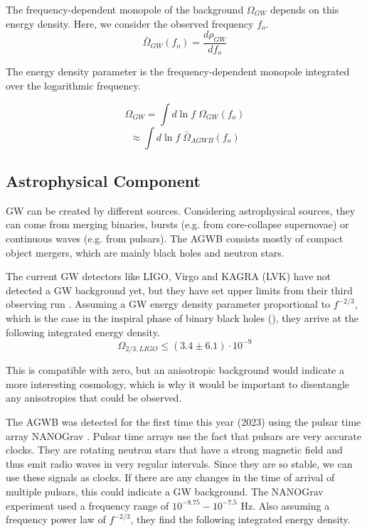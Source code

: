 The frequency-dependent monopole of the background $\Omega_{GW}$ depends on this energy density. Here, we consider the observed frequency $f_o$.
\begin{equation}
    \bar{\Omega}_{GW}(f_o)=\frac{d\rho_{GW}}{df_o}
\end{equation}

The energy density parameter is the frequency-dependent monopole integrated over the logarithmic frequency.

\begin{equation}
    \Omega_{GW} = \int d\ln f \; \Omega_{GW}(f_o) 
\end{equation}
\begin{equation}
    \approx \int d\ln f \; \bar{\Omega}_{AGWB}(f_o)
\end{equation}

\subsection{Astrophysical Component}
\label{astro_GWB}
GW can be created by different sources. Considering astrophysical sources, they can come from
merging binaries, bursts (e.g. from core-collapse supernovae) or continuous waves 
(e.g. from pulsars). 
The AGWB consists mostly of compact object mergers, which are mainly black holes and neutron stars. 

The current GW detectors like LIGO, Virgo and KAGRA (LVK) have not detected a GW background yet, but they have set upper limits from their third observing run \cite{abbott_upper_2021}. Assuming a GW energy density parameter proportional to $f^{-2/3}$, which is the case in the inspiral phase of binary black holes (\cite{phinney_practical_2001}), they arrive at the following integrated energy density.
\begin{equation}
    \Omega_{2/3, LIGO} \leq (3.4 \pm 6.1) \cdot 10^{-9}
\end{equation}

This is compatible with zero, but an anisotropic background would indicate
a more interesting cosmology, which is why it would be important to disentangle
any anisotropies that could be observed.

The AGWB was detected for the first time this year (2023) using the pulsar time array NANOGrav \cite{agazie_nanograv_2023}. Pulsar time arrays use the fact that pulsars are very accurate clocks. They are rotating neutron stars that have a strong magnetic field and thus emit radio waves in very regular intervals. Since they are so stable, we can use these signals as clocks. If there are any changes in the time of arrival of multiple pulsars, this could indicate a GW background. 
The NANOGrav experiment used a frequency range of $10^{-8.75} - 10^{-7.5}$ Hz. 
Also assuming a frequency power law of $f^{-2/3}$, they find the following integrated energy density.

